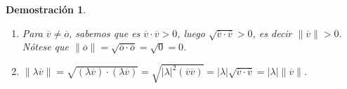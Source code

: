 \documentclass[a4paper,11pt]{article}
\theoremstyle{teoremas}
\theoremstyle{ejemplos}
\theoremstyle{definiciones}
\theoremstyle{lemas}
\newtheorem*{demostracion}{Demostraci\'on}
\begin{document}
\begin{demostracion}
 $\phantom{0}$
 \begin{enumerate}
  \item Para $\overline{v} \neq \overline{o}$, sabemos que es $\overline{v}\cdot \overline{v} > 0$, luego $\sqrt{\overline{v}\cdot \overline{v}} > 0$, es decir $\lVert \overline{v} \rVert > 0$. N\'otese que $\lVert \overline{o} \rVert = \sqrt{\overline{o} \cdot \overline{o}} = \sqrt{0} = 0$.
  
  \item $\rVert \lambda \overline{v} \rVert = \sqrt{(\lambda\overline{v}) \cdot (\lambda \overline{v})} = \sqrt{\rvert \lambda \lvert^2 (\overline{v}\overline{v})} = \lvert \lambda \rvert \sqrt{\overline{v} \cdot \overline{v}} = \lvert \lambda \rvert \lVert \overline{v} \rVert$.
  

\end{enumerate}
\end{demostracion}
\end{document}
